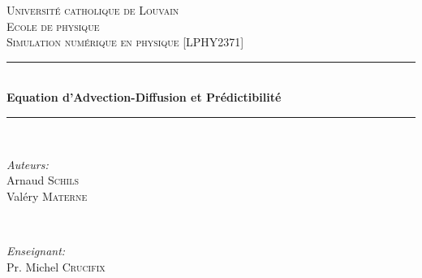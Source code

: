 \documentclass[a4paper, 12pt]{report}
\begin{document}
\begin{titlepage}

\newcommand{\HRule}{\rule{\linewidth}{0.5mm}} %

\center %


\textsc{\LARGE Université catholique de Louvain}\\[0.5cm] %
\textsc{\Large Ecole de physique}\\[1.5cm] %
\textsc{\Large Simulation numérique en physique [\textsc{\normalsize LPHY2371}]}\\[0.5cm]


\HRule \\[0.4cm]
{ \huge \bfseries Equation d'Advection-Diffusion et Prédictibilité}\\[0.4cm] %
\HRule \\[1.5cm]


\begin{minipage}[t]{0.6\textwidth}
\begin{flushleft} \large
\begin{tabbing}
\emph{Auteurs:}\\
Arnaud \hspace{0.2cm}\= \textsc{Schils}\\ %
Valéry \> \textsc{Materne}
\end{tabbing}
\end{flushleft}
\end{minipage}
~
\begin{minipage}[t]{0.6\textwidth}
\begin{flushright} \large
\emph{Enseignant:} \\
Pr. Michel \textsc{Crucifix} %
\end{flushright}
\end{minipage}\\[1.5cm]


\end{titlepage}
\end{document}
